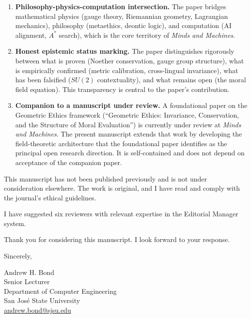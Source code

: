 \documentclass[12pt]{article}
\begin{document}
\begin{enumerate}
    \item \textbf{Philosophy-physics-computation intersection.} The paper bridges mathematical physics (gauge theory, Riemannian geometry, Lagrangian mechanics), philosophy (metaethics, deontic logic), and computation (AI alignment, $A^*$ search), which is the core territory of \textit{Minds and Machines}.

    \item \textbf{Honest epistemic status marking.} The paper distinguishes rigorously between what is proven (Noether conservation, gauge group structure), what is empirically confirmed (metric calibration, cross-lingual invariance), what has been falsified ($SU(2)$ contextuality), and what remains open (the moral field equation). This transparency is central to the paper's contribution.

    \item \textbf{Companion to a manuscript under review.} A foundational paper on the Geometric Ethics framework (``Geometric Ethics: Invariance, Conservation, and the Structure of Moral Evaluation'') is currently under review at \textit{Minds and Machines}. The present manuscript extends that work by developing the field-theoretic architecture that the foundational paper identifies as the principal open research direction. It is self-contained and does not depend on acceptance of the companion paper.
\end{enumerate}

This manuscript has not been published previously and is not under consideration elsewhere. The work is original, and I have read and comply with the journal's ethical guidelines.

I have suggested six reviewers with relevant expertise in the Editorial Manager system.

Thank you for considering this manuscript. I look forward to your response.

\bigskip

\noindent
Sincerely,

\bigskip

\noindent
Andrew H. Bond\\
Senior Lecturer\\
Department of Computer Engineering\\
San Jos\'{e} State University\\
\href{mailto:andrew.bond@sjsu.edu}{andrew.bond@sjsu.edu}
\end{document}
